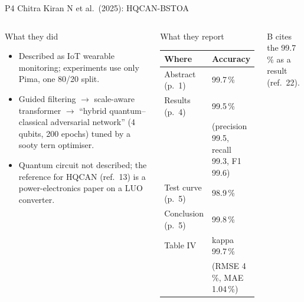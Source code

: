 \documentclass[aspectratio=169,10pt,t,xcolor={table}]{beamer}
\begin{document}
\begin{frame}{P4 \quad Chitra Kiran N et al.\ (2025): HQCAN-BSTOA}
\begin{columns}[T]
\begin{block}{What they did}
\footnotesize
\begin{itemize}
  \item Described as IoT wearable monitoring; experiments use only Pima, one 80/20 split.
  \item Guided filtering $\to$ scale-aware transformer $\to$ ``hybrid quantum--classical adversarial network'' (4 qubits, 200 epochs) tuned by a sooty tern optimiser.
  \item Quantum circuit not described; the reference for HQCAN (ref.\ 13) is a power-electronics paper on a LUO converter.
\end{itemize}
\end{block}
\begin{block}{What they report}
\scriptsize
\begin{tabular}{ll}
\toprule
Where & Accuracy \\
\midrule
Abstract (p.~1) & 99.7\,\% \\
Results (p.~4) & 99.5\,\% \\
 & (precision 99.5, recall 99.3, F1 99.6) \\
Test curve (p.~5) & 98.9\,\% \\
Conclusion (p.~5) & 99.8\,\% \\
Table IV & kappa 99.7\,\% \\
 & (RMSE 4\,\%, MAE 1.04\,\%) \\
\bottomrule
\end{tabular}
\end{block}
\footnotesize B cites the 99.7\,\% as a result (ref.\ 22).
\end{columns}
\end{frame}
\end{document}

